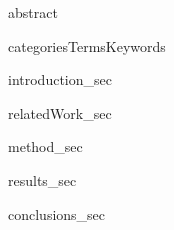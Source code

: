 
{abstract}


{categoriesTermsKeywords}

{introduction_sec}

{relatedWork_sec}

{method_sec}

{results_sec}

{conclusions_sec}

